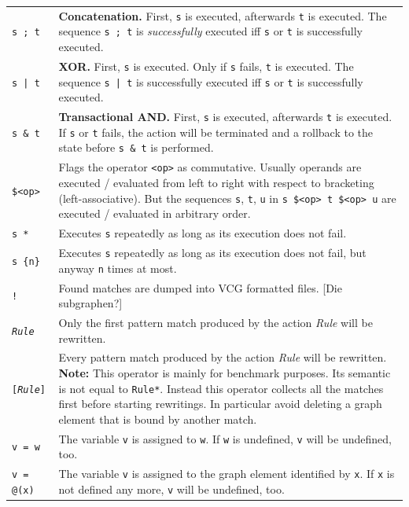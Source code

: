 \documentclass[a4paper,11pt]{report}
\begin{document}
\begin{table}[htbp]
\begin{tabularx}{\linewidth}{|lX|}
\hline
\texttt{s ; t}		& \textbf{Concatenation.} First, \texttt{s} is executed, afterwards \texttt{t} is executed. The sequence \texttt{s ; t} is \emph{successfully} executed iff \texttt{s} or \texttt{t} is successfully executed.\\
\texttt{s | t}		& \textbf{XOR.} First, \texttt{s} is executed. Only if \texttt{s} fails, \texttt{t} is executed. The sequence \texttt{s | t} is successfully executed iff \texttt{s} or \texttt{t} is successfully executed.\\
\texttt{s \& t}	& \textbf{Transactional AND.} First, \texttt{s} is executed, afterwards \texttt{t} is executed. If \texttt{s} or \texttt{t} fails, the action will be terminated and a rollback to the state before \texttt{s \& t} is performed.\\
\texttt{\$<op>}	& Flags the operator \texttt{<op>} as commutative. Usually operands are executed / evaluated from left to right with respect to bracketing (left-associative). But the sequences \texttt{s}, \texttt{t}, \texttt{u} in \texttt{s \$<op> t \$<op> u} are executed / evaluated in arbitrary order. \\
\texttt{s *}		& Executes \texttt{s} repeatedly as long as its execution does not fail.\\
\texttt{s \{n\}}	& Executes \texttt{s} repeatedly as long as its execution does not fail, but anyway \texttt{n} times at most.\\
\texttt{!}		& Found matches are dumped into VCG formatted files. [Die subgraphen?]\\
\texttt{\emph{Rule}} & Only the first pattern match produced by the action \emph{Rule} will be rewritten.\\
\texttt{[\emph{Rule}]} & Every pattern match produced by the action \emph{Rule} will be rewritten. \textbf{Note:} This operator is mainly for benchmark purposes. Its semantic is not equal to \texttt{Rule*}. Instead this operator collects all the matches first before starting rewritings. In particular avoid deleting a graph element that is bound by another match. \\
\texttt{v = w}	& The variable \texttt{v} is assigned to \texttt{w}. If \texttt{w} is undefined, \texttt{v} will be undefined, too.\\
\texttt{v = @(x)}	& The variable \texttt{v} is assigned to the graph element identified by \texttt{x}. If \texttt{x} is not defined any more, \texttt{v} will be undefined, too.\\

\end{tabularx}
\end{table}
\end{document}
